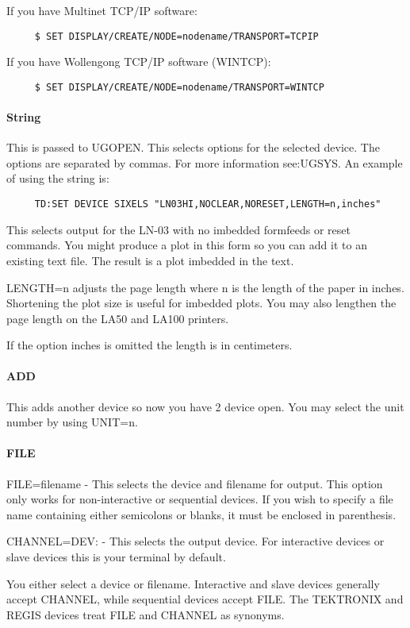 If you have Multinet TCP/IP software:  
\begin{verbatim}
     $ SET DISPLAY/CREATE/NODE=nodename/TRANSPORT=TCPIP 
\end{verbatim}
If you have Wollengong TCP/IP software (WINTCP):  
\begin{verbatim}
     $ SET DISPLAY/CREATE/NODE=nodename/TRANSPORT=WINTCP 
\end{verbatim}
\paragraph{String}
This  is  passed  to  UGOPEN.   This selects options for the selected
device.  The options are separated by commas.  For  more  information
see:UGSYS.  An example of using the string is:  
\begin{verbatim}
     TD:SET DEVICE SIXELS "LN03HI,NOCLEAR,NORESET,LENGTH=n,inches" 
\end{verbatim}

This selects output for the LN-03 with no imbedded formfeeds or reset
commands.  You might produce a plot in this form so you can add it to
an existing text file.  The result is a plot imbedded in the text.  

LENGTH=n  adjusts  the page length where n is the length of the paper
in inches.  Shortening the plot size is useful  for  imbedded  plots.
You may also lengthen the page length on the LA50 and LA100 printers. 

If the option inches is omitted the length is in centimeters.  
\paragraph{ADD}
This  adds  another  device  so  now you have 2 device open.  You may
select the unit number by using UNIT=n.  
\paragraph{FILE}
FILE=filename  -  This  selects  the  device and filename for output.
This option only works for non-interactive or sequential devices.  If
you  wish  to  specify  a  file  name containing either semicolons or
blanks, it must be enclosed in parenthesis.  

CHANNEL=DEV:   -  This  selects  the  output device.  For interactive
devices or slave devices this is your terminal by default.  

You  either  select  a  device  or  filename.   Interactive and slave
devices generally accept CHANNEL,  while  sequential  devices  accept
FILE.   The  TEKTRONIX  and  REGIS  devices treat FILE and CHANNEL as
synonyms.  
